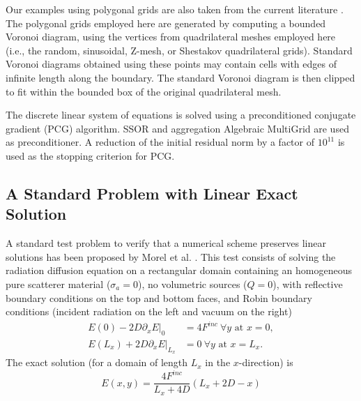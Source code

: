 \documentclass[preprint,10pt]{elsarticle}
\begin{document}
Our examples using polygonal grids are also taken from the current literature 
\cite{Kuznetsov2004,Brezzi2005,BaileyAdams2008}.
The polygonal grids employed here are generated by computing a bounded Voronoi diagram, using the 
vertices from quadrilateral meshes employed here (i.e., the random, sinusoidal, Z-mesh, 
or Shestakov quadrilateral grids). Standard Voronoi diagrams obtained using these points 
may contain cells with edges of infinite length along the boundary. The standard Voronoi diagram 
is then clipped to fit within the bounded box of the original quadrilateral mesh.

The discrete linear system of equations is solved using a preconditioned conjugate gradient (PCG) algorithm. 
SSOR and aggregation Algebraic MultiGrid \cite{agmg}  are used as preconditioner. A reduction of the
initial residual norm by a factor of $10^{11}$ is used as the stopping criterion for PCG. 

\subsection{A Standard Problem with Linear Exact Solution} \label{sec:results_linear}
A standard test problem to verify that a numerical scheme preserves linear solutions has been
proposed by Morel et al. \cite{Morel1992}. This test consists
of solving the radiation diffusion equation on a rectangular domain containing an homogeneous pure 
scatterer material ($\sigma_a=0$), no volumetric sources ($Q=0$), with reflective boundary conditions 
on the top and bottom faces, and Robin boundary conditions (incident radiation on the left and vacuum on the right)
\begin{align}
  E(0) - 2 D \left.\partial_x E\right|_0 &= 4F^{inc} \ \forall y \textrm{ at } x=0, \\
  E(L_x) + 2 D \left.\partial_x E\right|_{L_x} &= 0 \ \forall y \textrm{ at } x=L_x.
\end{align}
The exact solution (for a domain of length $L_x$ in the $x$-direction) is
\begin{equation}
E(x,y) = 	\frac{4F^{inc}}{L_x+4D}\left(L_x+2D-x \right)
\end{equation}
\end{document}
